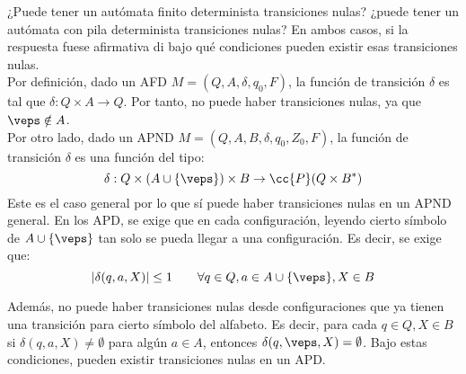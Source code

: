 \documentclass[12pt]{article}
\begin{document}
    \begin{ejercicio}[1.25 puntos]
        ¿Puede tener un autómata finito determinista transiciones nulas? ¿puede tener un autómata con pila determinista
        transiciones nulas? En ambos casos, si la respuesta fuese afirmativa di bajo qué condiciones pueden existir esas transiciones nulas.\\

        Por definición, dado un AFD $M=(Q,A,\delta,q_0,F)$, la función de transición $\delta$ es tal que $\delta:Q\times A\to Q$. Por tanto, no puede haber transiciones nulas, ya que $\veps\notin A$.\\

        Por otro lado, dado un APND $M=(Q,A,B,\delta,q_0,Z_0,F)$, la función de transición $\delta$ es una función del tipo:
        \begin{equation*}
            \delta:Q\times (A\cup\{\veps\})\times B\to \cc{P}(Q\times B^*)
        \end{equation*}
        Este es el caso general por lo que sí puede haber transiciones nulas en un APND general. En los APD, se exige que en cada configuración, leyendo cierto símbolo de $A\cup \{\veps\}$ tan solo se pueda llegar a una configuración. Es decir, se exige que:
        \begin{equation*}
            |\delta(q,a,X)|\leq 1 \qquad \forall q\in Q,a\in A\cup\{\veps\},X\in B
        \end{equation*}

        Además, no puede haber transiciones nulas desde configuraciones que ya tienen una transición para cierto símbolo del alfabeto. Es decir, para cada $q\in Q,X\in B$ si $\delta(q,a,X)\neq \emptyset$ para algún $a\in A$, entonces $\delta(q,\veps,X)=\emptyset$. Bajo estas condiciones, pueden existir transiciones nulas en un APD.
    \end{ejercicio}
\end{document}
